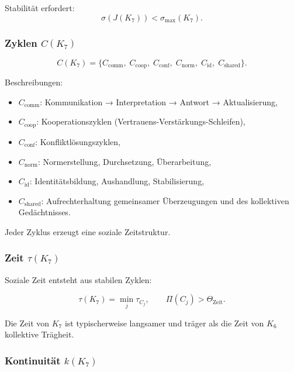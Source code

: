 Stabilität erfordert:
\[
\sigma(J(K_7)) < \sigma_{\max}(K_7).
\]

\subsubsection{Zyklen \texorpdfstring{$C(K_7)$}{C(K_7)}}

\[
C(K_7)=
\{
C_{\mathrm{comm}},\;
C_{\mathrm{coop}},\;
C_{\mathrm{conf}},\;
C_{\mathrm{norm}},\;
C_{\mathrm{id}},\;
C_{\mathrm{shared}}
\}.
\]

Beschreibungen:
\begin{itemize}
    \item $C_{\mathrm{comm}}$: Kommunikation → Interpretation → Antwort → Aktualisierung,
    \item $C_{\mathrm{coop}}$: Kooperationszyklen (Vertrauens-Verstärkungs-Schleifen),
    \item $C_{\mathrm{conf}}$: Konfliktlösungszyklen,
    \item $C_{\mathrm{norm}}$: Normerstellung, Durchsetzung, Überarbeitung,
    \item $C_{\mathrm{id}}$: Identitätsbildung, Aushandlung, Stabilisierung,
    \item $C_{\mathrm{shared}}$: Aufrechterhaltung gemeinsamer Überzeugungen und des kollektiven Gedächtnisses.
\end{itemize}

Jeder Zyklus erzeugt eine soziale Zeitstruktur.

\subsubsection{Zeit \texorpdfstring{$\tau(K_7)$}{\tau(K_7)}}

Soziale Zeit entsteht aus stabilen Zyklen:

\[
\tau(K_7)
= \min_j \tau_{C_j},
\qquad
\Pi(C_j) > \Theta_{\mathrm{Zeit}}.
\]

Die Zeit von $K_7$ ist typischerweise langsamer und träger als die Zeit von $K_6$
kollektive Trägheit.

\subsubsection{Kontinuität \texorpdfstring{$k(K_7)$}{k(K_7)}}

